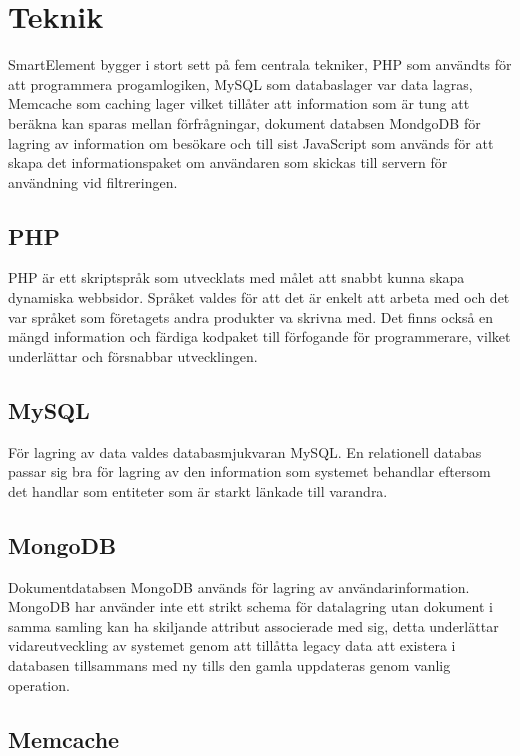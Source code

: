 \section{Teknik}

SmartElement bygger i stort sett på fem centrala tekniker, PHP som användts för att programmera progamlogiken, MySQL som databaslager var data lagras, Memcache som caching lager vilket tillåter att information som är tung att beräkna kan sparas mellan förfrågningar, dokument databsen MondgoDB för lagring av information om besökare och till sist JavaScript som används för att skapa det informationspaket om användaren som skickas till servern för användning vid filtreringen.

\subsection{PHP}

PHP är ett skriptspråk som utvecklats med målet att snabbt kunna skapa dynamiska webbsidor. \citep{phpmanual} Språket valdes för att det är enkelt att arbeta med och det var språket som företagets andra produkter va skrivna med. Det finns också en mängd information och färdiga kodpaket till förfogande för programmerare, vilket underlättar och försnabbar utvecklingen.

\subsection{MySQL}

För lagring av data valdes databasmjukvaran MySQL. En relationell databas passar sig bra för lagring av den information som systemet behandlar eftersom det handlar som entiteter som är starkt länkade till varandra.

\subsection{MongoDB}

Dokumentdatabsen MongoDB används för lagring av användarinformation. MongoDB har använder inte ett strikt schema för datalagring utan dokument i samma samling kan ha skiljande attribut associerade med sig, detta underlättar vidareutveckling av systemet genom att tillåtta legacy data att existera i databasen tillsammans med ny tills den gamla uppdateras genom vanlig operation.

\subsection{Memcache}

